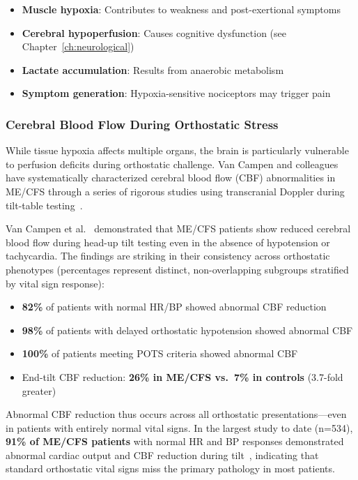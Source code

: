 \begin{itemize}
    \item \textbf{Muscle hypoxia}: Contributes to weakness and post-exertional symptoms
    \item \textbf{Cerebral hypoperfusion}: Causes cognitive dysfunction (see Chapter~\ref{ch:neurological})
    \item \textbf{Lactate accumulation}: Results from anaerobic metabolism
    \item \textbf{Symptom generation}: Hypoxia-sensitive nociceptors may trigger pain
\end{itemize}

\subsubsection{Cerebral Blood Flow During Orthostatic Stress}
\label{sec:cerebral-orthostatic}

While tissue hypoxia affects multiple organs, the brain is particularly vulnerable to perfusion deficits during orthostatic challenge. Van Campen and colleagues have systematically characterized cerebral blood flow (CBF) abnormalities in ME/CFS through a series of rigorous studies using transcranial Doppler during tilt-table testing~\cite{VanCampenEtAl2020,VanCampenEtAl2021,VanCampenEtAl2023,VanCampenEtAl2024}.

\begin{achievement}
\label{ach:cbf-decline}
Van Campen et al.~\cite{VanCampenEtAl2020} demonstrated that ME/CFS patients show reduced cerebral blood flow during head-up tilt testing even in the absence of hypotension or tachycardia. The findings are striking in their consistency across orthostatic phenotypes (percentages represent distinct, non-overlapping subgroups stratified by vital sign response):
\begin{itemize}
    \item \textbf{82\%} of patients with normal HR/BP showed abnormal CBF reduction
    \item \textbf{98\%} of patients with delayed orthostatic hypotension showed abnormal CBF
    \item \textbf{100\%} of patients meeting POTS criteria showed abnormal CBF
    \item End-tilt CBF reduction: \textbf{26\% in ME/CFS vs.\ 7\% in controls} (3.7-fold greater)
\end{itemize}
Abnormal CBF reduction thus occurs across all orthostatic presentations---even in patients with entirely normal vital signs. In the largest study to date (n=534), \textbf{91\% of ME/CFS patients} with normal HR and BP responses demonstrated abnormal cardiac output and CBF reduction during tilt~\cite{VanCampenEtAl2024}, indicating that standard orthostatic vital signs miss the primary pathology in most patients.
\end{achievement}

